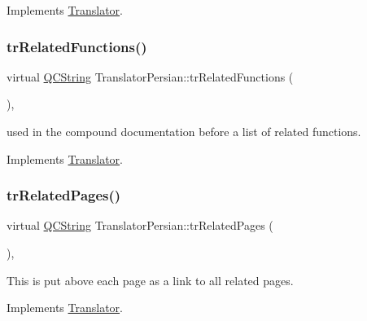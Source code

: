 Implements \mbox{\hyperlink{class_translator}{Translator}}.

\mbox{\label{class_translator_persian_a9b0bf40e2fe0dfbdec5c06004aa60f69}} 
\subsubsection{\texorpdfstring{trRelatedFunctions()}{trRelatedFunctions()}}
{\footnotesize\ttfamily virtual \mbox{\hyperlink{class_q_c_string}{Q\+C\+String}} Translator\+Persian\+::tr\+Related\+Functions (\begin{DoxyParamCaption}{ }\end{DoxyParamCaption})\hspace{0.3cm}{\ttfamily [inline]}, {\ttfamily [virtual]}}

used in the compound documentation before a list of related functions. 

Implements \mbox{\hyperlink{class_translator}{Translator}}.

\mbox{\label{class_translator_persian_aa7e751f8213d7f91c5bfb8ffd9e063c6}} 
\subsubsection{\texorpdfstring{trRelatedPages()}{trRelatedPages()}}
{\footnotesize\ttfamily virtual \mbox{\hyperlink{class_q_c_string}{Q\+C\+String}} Translator\+Persian\+::tr\+Related\+Pages (\begin{DoxyParamCaption}{ }\end{DoxyParamCaption})\hspace{0.3cm}{\ttfamily [inline]}, {\ttfamily [virtual]}}

This is put above each page as a link to all related pages. 

Implements \mbox{\hyperlink{class_translator}{Translator}}.

\mbox{\label{class_translator_persian_a19060171a5a33e915fd441280f7aa30e}} 
